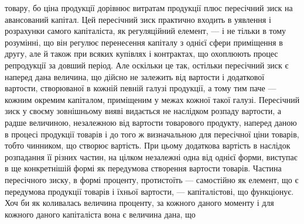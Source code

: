 товару, бо ціна продукції дорівнює витратам продукції плюс пересічний
зиск на авансований капітал. Цей пересічний зиск практично входить в
уявлення і розрахунки самого капіталіста, як регуляційний елемент, — і не
тільки в тому розумінні, що він регулює перенесення капіталу з однієї сфери
приміщення в другу, але й також при всяких купівлях і контрактах, що охоплюють
процес репродукції за довший період. Але оскільки це так, остільки пересічний
зиск є наперед дана величина, що дійсно не залежить від вартости і додаткової
вартости, створюваної в кожній певній галузі продукції, а тому тим паче —
кожним окремим капіталом, приміщеним у межах кожної такої галузі. Пересічний
зиск у своєму зовнішньому вияві видається не наслідком розпаду вартости,
а радше величиною, незалежною від вартости товарового продукту, наперед даною
в процесі продукції товарів і до того ж визначальною для пересічної ціни
товарів, тобто чинником, що створює вартість. При цьому додаткова вартість
в наслідок розпадання її різних частин, на цілком незалежні одна від однієї
форми, виступає в ще конкретнішій формі як передумова створення вартости
товарів. Частина пересічного зиску, в формі проценту, протистоїть — самостійно
як елемент, що є передумова продукції товарів і їхньої вартости, — капіталістові,
що функціонує. Хоч би як коливалась величина проценту, за кожного
даного моменту і для кожного даного капіталіста вона є величина дана, що
\parbreak{}  %
